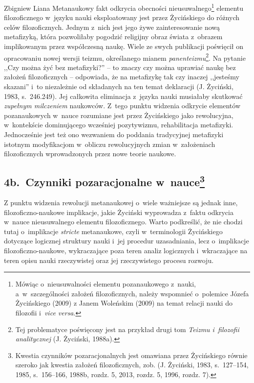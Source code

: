 \begin{artplenv}{Zbigniew Liana}
Metanaukowy fakt odkrycia obecności nieusuwalnego\footnote{Mówiąc o~nieusuwalności elementu
pozanaukowego z~nauki, a~w~szczególności założeń filozoficznych,
należy wspomnieć o~polemice Józefa Życińskiego \label{ref:RND1yIXITCd0q}(2009) z
Janem Woleńskim \label{ref:RNDgHTjy4YLsK}(2009) na temat relacji nauki do filozofii i~\textit{vice versa}.} elementu
filozoficznego w~języku nauki eksploatowany jest przez Życińskiego do różnych celów filozoficznych. Jednym z~nich jest
jego żywe zainteresowanie nową metafizyką, która pozwoliłaby pogodzić religijny obraz świata z~obrazem implikowanym
przez współczesną naukę. Wiele ze swych publikacji poświęcił on opracowaniu nowej wersji teizmu, określanego mianem
\textit{panenteizmu}\footnote{Tej problematyce poświęcony jest na przykład drugi tom \textit{Teizmu i~filozofii
analitycznej} \label{ref:RNDIkjJ8iRdco}(J. Życiński, 1988a).}. Na pytanie ,,Czy można żyć bez metafizyki?'' -- to znaczy
czy można uprawiać naukę bez założeń filozoficznych -- odpowiada, że na metafizykę tak czy inaczej
,,jesteśmy skazani'' i~to niezależnie od składanych na ten temat
deklaracji \label{ref:RNDBwmyHW0qHJ}(J. Życiński, 1983, s.~246.249).
Jej całkowita eliminacja z~języka nauki musiałaby skutkować \textit{zupełnym milczeniem} naukowców. Z~tego punktu widzenia
odkrycie elementów pozanaukowych w~nauce rozumiane jest przez Życińskiego jako rewolucyjna, w~kontekście dominującego
wcześniej pozytywizmu, rehabilitacja metafizyki. Jednocześnie jest też ono wezwaniem do poddania tradycyjnej metafizyki
istotnym modyfikacjom w~obliczu rewolucyjnych zmian w~założeniach filozoficznych wprowadzonych przez nowe teorie
naukowe. 

\subsection{4b.~Czynniki pozaracjonalne w~nauce\footnote{Kwestia czynników pozaracjonalnych jest omawiana przez Życińskiego równie
szeroko jak kwestia założeń filozoficznych, zob. \label{ref:RND5w30wnfua2}(J. Życiński, 1983, s.~127–154, 1985, s.~156–166,
1988b, rozdz. 5, 2013, rozdz. 5, 1996, rozdz. 7).}}

Z punktu widzenia rewolucji metanaukowej o~wiele ważniejsze są jednak inne, filozoficzno-naukowe implikacje, jakie
Życiński wyprowadza z~faktu odkrycia w~nauce nieusuwalnego elementu filozoficznego. Warto podkreślić, że nie chodzi
tutaj o~implikacje \textit{stricte} metanaukowe, czyli w~terminologii Życińskiego dotyczące logicznej struktury nauki i~jej
procedur uzasadniania, lecz o~implikacje filozoficzno-naukowe, wykraczające poza teren analiz
logicznych i~wkraczające na teren opisu nauki rzeczywistej oraz jej rzeczywistego procesu rozwoju. 


\end{artplenv}
